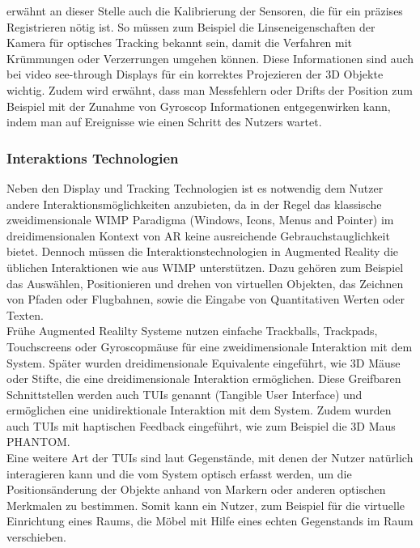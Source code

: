 \citet{azuma2001recent} erwähnt an dieser Stelle auch die Kalibrierung der Sensoren, die für ein präzises Registrieren nötig ist. So müssen zum Beispiel die Linseneigenschaften der Kamera für optisches Tracking bekannt sein, damit die Verfahren mit Krümmungen oder Verzerrungen umgehen können. Diese Informationen sind auch bei video see-through Displays für ein korrektes Projezieren der 3D Objekte wichtig. Zudem wird erwähnt, dass man Messfehlern oder Drifts der Position zum Beispiel mit der Zunahme von Gyroscop Informationen entgegenwirken kann, indem man auf Ereignisse wie einen Schritt des Nutzers wartet. \citep{azuma2001recent} \\

\subsubsection{Interaktions Technologien}

Neben den Display und Tracking Technologien ist es notwendig dem Nutzer andere Interaktionsmöglichkeiten anzubieten, da in der Regel das klassische zweidimensionale WIMP Paradigma (Windows, Icons, Menus and Pointer) im dreidimensionalen Kontext von AR keine ausreichende Gebrauchstauglichkeit bietet. Dennoch müssen die Interaktionstechnologien in Augmented Reality die üblichen Interaktionen wie aus WIMP unterstützen. Dazu gehören zum Beispiel das Auswählen, Positionieren und drehen von virtuellen Objekten, das Zeichnen von Pfaden oder Flugbahnen, sowie die Eingabe von Quantitativen Werten oder Texten. \citep{van2010survey} \\

Frühe Augmented Realilty Systeme nutzen einfache Trackballs, Trackpads, Touchscreens oder Gyroscopmäuse für eine zweidimensionale Interaktion mit dem System. Später wurden dreidimensionale Equivalente eingeführt, wie 3D Mäuse oder Stifte, die eine dreidimensionale Interaktion ermöglichen. Diese Greifbaren Schnittstellen werden auch TUIs genannt (Tangible User Interface) und ermöglichen eine unidirektionale Interaktion mit dem System. Zudem wurden auch TUIs mit haptischen Feedback eingeführt, wie zum Beispiel die 3D Maus PHANTOM. \citep{van2010survey} \\

Eine weitere Art der TUIs sind laut \citet{azuma2001recent} Gegenstände, mit denen der Nutzer natürlich interagieren kann und die vom System optisch erfasst werden, um die Positionsänderung der Objekte anhand von Markern oder anderen optischen Merkmalen zu bestimmen. Somit kann ein Nutzer, zum Beispiel für die virtuelle Einrichtung eines Raums, die Möbel mit Hilfe eines echten Gegenstands im Raum verschieben. \\

